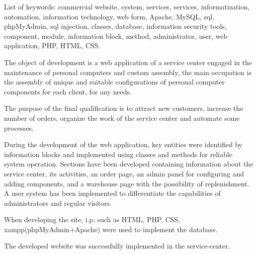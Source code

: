 List of keywords: commercial website, system, services, services, informatization, automation, information technology, web form, Apache, MySQL, sql, phpMyAdmin, sql injection, classes, database, information security tools, component, module, information block, method, administrator, user, web application, PHP, HTML, CSS.

The object of development is a web application of a service center engaged in the maintenance of personal computers and custom assembly, the main occupation is the assembly of unique and suitable configurations of personal computer components for each client, for any needs.

The purpose of the final qualification is to attract new customers, increase the number of orders, organize the work of the service center and automate some processes.

During the development of the web application, key entities were identified by information blocks and implemented using classes and methods for reliable system operation. Sections have been developed containing information about the service center, its activities, an order page, an admin panel for configuring and adding components, and a warehouse page with the possibility of replenishment. A user system has been implemented to differentiate the capabilities of administrators and regular visitors.

When developing the site, i.p. such as HTML, PHP, CSS, xampp(phpMyAdmin+Apache) were used to implement the database.

The developed website was successfully implemented in the service-center.
